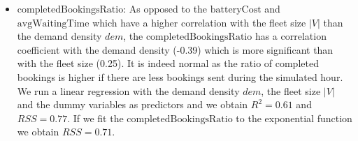\documentclass[12pt,a4paper]{article}
\begin{document}
\begin{itemize}
\item $\text{completedBookingsRatio}$: As opposed to the $\text{batteryCost}$ and $\text{avgWaitingTime}$ which have a higher correlation with the fleet size $|V|$ than the demand density $dem$, the $\text{completedBookingsRatio}$ has a correlation coefficient with the demand density (-0.39) which is more significant than with the fleet size (0.25). It is indeed normal as the ratio of completed bookings is higher if there are less bookings sent during the simulated hour. We run a linear regression with the demand density $dem$, the fleet size $|V|$ and the dummy variables as predictors and we obtain $R^{2} = 0.61$ and $RSS = 0.77$. If we fit the $\text{completedBookingsRatio}$ to the exponential function we obtain $RSS = 0.71$.

\end{itemize}
\end{document}
